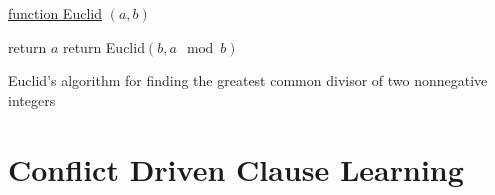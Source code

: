 \begin{algorithm}

    \underline{function Euclid} $(a,b)$

    {
        return $a$\;
    }
    {
        return Euclid$(b,a\mod b)$\;
    }
\caption{Euclid's algorithm for finding the greatest common divisor of two nonnegative integers}
\end{algorithm}

\section{Conflict Driven Clause Learning}
\label{sec:cdcl}
